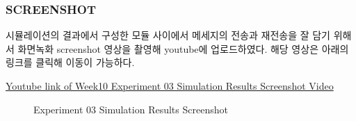         \subsubsection{SCREENSHOT}
        시뮬레이션의 결과에서 구성한 모듈 사이에서 메세지의 전송과 재전송을 잘 담기 위해서 화면녹화 screenshot 영상을 촬영해 youtube에 업로드하였다. 해당 영상은 아래의 링크를 클릭해 이동이 가능하다.
        \vspace{-10mm}
            \begin{center}
                \item \href{https://youtu.be/D_AXEdjixsc}
            	{Youtube link of Week10 Experiment 03 Simulation Results Screenshot Video}
            \end{center}
        \vspace{-6mm}
\clearpage
            \begin{figure}[h!]
            \centering
            \hspace{3mm}
            \caption{Experiment 03 Simulation Results Screenshot}
            \end{figure}
            \vspace{-6mm}
